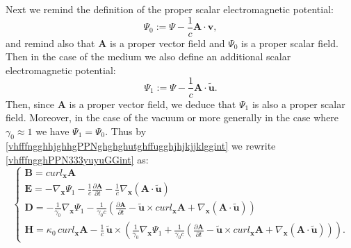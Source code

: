 \documentclass{article}
\theoremstyle{definition}
\theoremstyle{remark}
\renewcommand{\vec}[1]{\mathbf{#1}}
\newcommand{\er}{\eqref}
\newcommand{\er}{\eqref}
\begin{document}
Next we remind the definition of the proper scalar electromagnetic
potential:
\begin{equation}\label{vhfffngghhjghhgPPNghghghutghffugghjhjkjjklggkkkint}
\Psi_0:=\Psi-\frac{1}{c}\vec A\cdot\vec v,
\end{equation}
and remind also that $\vec A$ is a proper vector field and $\Psi_0$
is a proper scalar field. Then in the case of the medium we also
define an additional scalar electromagnetic potential:
\begin{equation}\label{vhfffngghhjghhgPPNghghghutghffugghjhjkjjklggint}
\Psi_1:=\Psi-\frac{1}{c}\vec A\cdot\vec {\tilde u}.
\end{equation}
Then, since $\vec A$ is a proper vector field, we deduce that
$\Psi_1$ is also a proper scalar field. Moreover, in the case of the
vacuum or more generally in the case where $\gamma_0\approx 1$ we
have $\Psi_1=\Psi_0$. Thus by
\er{vhfffngghhjghhgPPNghghghutghffugghjhjkjjklggint} we rewrite
\er{vhfffngghPPN333yuyuGGint} as:
\begin{equation}\label{vhfffngghPPNffGGint}
\begin{cases}
\vec B= curl_{\vec x} \vec A\\
\vec E=-\nabla_{\vec x}\Psi_1-\frac{1}{c}\frac{\partial\vec
A}{\partial t}-\frac{1}{c}\nabla_{\vec x}\left(\vec A\cdot\vec
{\tilde u}\right)
\\
 \vec D=-\frac{1}{\gamma_0}\nabla_{\vec
x}\Psi_1-\frac{1}{\gamma_0 c}\left(\frac{\partial\vec A}{\partial
t}-\vec {\tilde u}\times curl_{\vec x}\vec A+\nabla_{\vec
x}\left(\vec A\cdot\vec {\tilde u}\right)\right)
\\
\vec H= \kappa_0\,curl_{\vec x} \vec A-\frac{1}{c}\,\vec {\tilde
u}\times
\left(\frac{1}{\gamma_0}\nabla_{\vec x}\Psi_1+\frac{1}{\gamma_0
c}\left(\frac{\partial\vec A}{\partial t}-\vec {\tilde u}\times
curl_{\vec x}\vec A+\nabla_{\vec x}\left(\vec A\cdot\vec {\tilde
u}\right)\right)\right).
\end{cases}
\end{equation}
%
%
%
\end{document}
